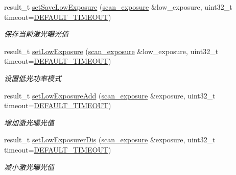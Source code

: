 \begin{DoxyCompactItemize}
\begin{DoxyCompactList}
\end{DoxyCompactList}\item 
result\+\_\+t \hyperlink{classydlidar_1_1_y_dlidar_driver_a73ef6628afc1eadf2f3079db99b383c6}{set\+Save\+Low\+Exposure} (\hyperlink{structscan__exposure}{scan\+\_\+exposure} \&low\+\_\+exposure, uint32\+\_\+t timeout=\hyperlink{classydlidar_1_1_y_dlidar_driver_a13a4f2dc4067b43794b2c47c06d5d27aa07c79ce96f468ff4b40495ef84584442}{D\+E\+F\+A\+U\+L\+T\+\_\+\+T\+I\+M\+E\+O\+UT})
\begin{DoxyCompactList}\small\item\em 保存当前激光曝光值 ~\newline
\end{DoxyCompactList}\item 
result\+\_\+t \hyperlink{classydlidar_1_1_y_dlidar_driver_a02257e37b792870a9c42f8abfbe543ad}{set\+Low\+Exposure} (\hyperlink{structscan__exposure}{scan\+\_\+exposure} \&low\+\_\+exposure, uint32\+\_\+t timeout=\hyperlink{classydlidar_1_1_y_dlidar_driver_a13a4f2dc4067b43794b2c47c06d5d27aa07c79ce96f468ff4b40495ef84584442}{D\+E\+F\+A\+U\+L\+T\+\_\+\+T\+I\+M\+E\+O\+UT})
\begin{DoxyCompactList}\small\item\em 设置低光功率模式 ~\newline
\end{DoxyCompactList}\item 
result\+\_\+t \hyperlink{classydlidar_1_1_y_dlidar_driver_a3f34ad1119b9b97c4af3936e80c182f4}{set\+Low\+Exposure\+Add} (\hyperlink{structscan__exposure}{scan\+\_\+exposure} \&exposure, uint32\+\_\+t timeout=\hyperlink{classydlidar_1_1_y_dlidar_driver_a13a4f2dc4067b43794b2c47c06d5d27aa07c79ce96f468ff4b40495ef84584442}{D\+E\+F\+A\+U\+L\+T\+\_\+\+T\+I\+M\+E\+O\+UT})
\begin{DoxyCompactList}\small\item\em 增加激光曝光值 ~\newline
\end{DoxyCompactList}\item 
result\+\_\+t \hyperlink{classydlidar_1_1_y_dlidar_driver_aece83871e5912d19bc7677676a5511f8}{set\+Low\+Exposurer\+Dis} (\hyperlink{structscan__exposure}{scan\+\_\+exposure} \&exposure, uint32\+\_\+t timeout=\hyperlink{classydlidar_1_1_y_dlidar_driver_a13a4f2dc4067b43794b2c47c06d5d27aa07c79ce96f468ff4b40495ef84584442}{D\+E\+F\+A\+U\+L\+T\+\_\+\+T\+I\+M\+E\+O\+UT})
\begin{DoxyCompactList}\small\item\em 减小激光曝光值 ~\newline

\end{DoxyCompactList}
\end{DoxyCompactItemize}
